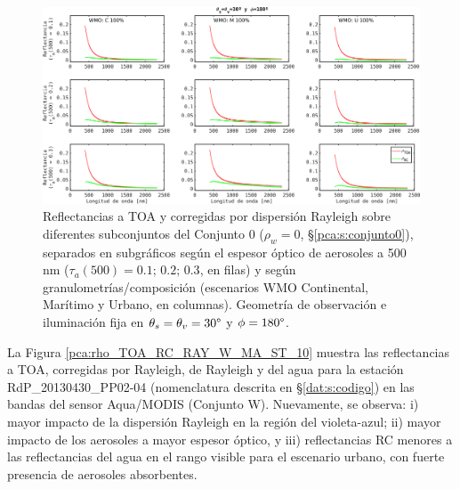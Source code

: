         \begin{figure}
        \centering
        \includegraphics[width=\textwidth]{pca/figures/RCvsTOA_OAA_30_OZA_30_RAA_180.png}
        \caption[Reflectancias a TOA y RC simuladas en ausencia de reflectancia del agua (agua negra).]{Reflectancias a TOA y corregidas por dispersión Rayleigh sobre diferentes subconjuntos del Conjunto $0$ ($\rho_{w}=0$, \S \ref{pca:s:conjunto0}), separados en subgráficos según el espesor óptico de aerosoles a 500 nm ($\tau_{a}(500) = 0.1;\,0.2;\,0.3$, en filas) y según granulometrías/composición (escenarios WMO Continental, Marítimo y Urbano, en columnas). Geometría de observación e iluminación fija en $\theta_{s} = \theta_{v} = 30 \degree$ y $\phi = 180 \degree$.}
        \label{pca:RCvsTOA_OAA_30_OZA_30_RAA_180}
        \end{figure}

        La Figura \ref{pca:rho_TOA_RC_RAY_W_MA_ST_10} muestra las reflectancias a TOA, corregidas por Rayleigh, de Rayleigh y del agua para la estación RdP\_20130430\_PP02-04 (nomenclatura descrita en \S \ref{dat:s:codigo}) en las bandas del sensor Aqua/MODIS (Conjunto W). Nuevamente, se observa: i) mayor impacto de la dispersión Rayleigh en la región del violeta-azul; ii) mayor impacto de los aerosoles a mayor espesor óptico, y iii) reflectancias RC menores a las reflectancias del agua en el rango visible para el escenario urbano, con fuerte presencia de aerosoles absorbentes.

